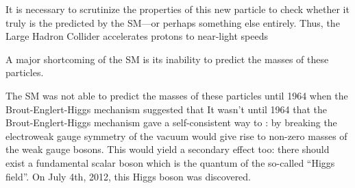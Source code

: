 It is necessary to scrutinize the properties of this new particle to check whether it truly is the \PH predicted by the SM---or perhaps something else entirely.
Thus, the Large Hadron Collider accelerates protons to near-light speeds 

A major shortcoming of the SM is its inability to predict the masses of these particles.

The SM was not able to predict the masses of these particles until 1964 when the Brout-Englert-Higgs mechanism suggested that 
It wasn't until 1964 that the Brout-Englert-Higgs mechanism gave a self-consistent way to :
by breaking the electroweak gauge symmetry of the vacuum would give rise to non-zero masses of the weak gauge bosons.
This would yield a secondary effect too:
there should exist a fundamental scalar boson which is the quantum of the so-called ``Higgs field''.
On July 4th, 2012, this Higgs boson was discovered.

